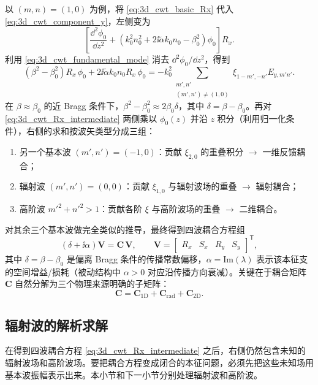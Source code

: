以 $(m,n)=(1,0)$ 为例，将 \cref{eq:3d_cwt_basic_Rx} 代入 \cref{eq:3d_cwt_component_y}，左侧变为
\[
\left[\frac{\dd^2\phi_0}{\dd z^2}+(k_0^2 n_0^2+2\ii\tilde\alpha k_0 n_0-\beta_0^2)\phi_0\right]R_x.
\]
利用 \cref{eq:3d_cwt_fundamental_mode} 消去 $\dd^2\phi_0/\dd z^2$，得到
\begin{equation}
(\beta^2-\beta_0^2)R_x\,\phi_0 + 2\ii\tilde\alpha k_0 n_0 R_x\,\phi_0
= -k_0^2\sum_{\substack{m',n'\\(m',n')\neq(1,0)}}\xi_{1-m',{-n'}}E_{y,m'n'}.
\label{eq:3d_cwt_Rx_intermediate}
\end{equation}
在 $\beta\approx\beta_0$ 的近 Bragg 条件下，$\beta^2-\beta_0^2\approx 2\beta_0\delta$，其中 $\delta=\beta-\beta_0$。再对 \cref{eq:3d_cwt_Rx_intermediate} 两侧乘以 $\phi_0(z)$ 并沿 $z$ 积分（利用归一化条件），右侧的求和按波矢类型分成三组：
\begin{enumerate}
  \item 另一个基本波 $(m',n')=(-1,0)$：贡献 $\xi_{2,0}$ 的重叠积分 $\to$ 一维反馈耦合；
  \item 辐射波 $(m',n')=(0,0)$：贡献 $\xi_{1,0}$ 与辐射波场的重叠 $\to$ 辐射耦合；
  \item 高阶波 $m'^2+n'^2>1$：贡献各阶 $\xi$ 与高阶波场的重叠 $\to$ 二维耦合。
\end{enumerate}
对其余三个基本波做完全类似的推导，最终得到四波耦合方程组
\begin{equation}
(\delta+\ii\alpha)\bm{V} = \bm{C}\,\bm{V},
\qquad
\bm{V} = \begin{bmatrix} R_x & S_x & R_y & S_y \end{bmatrix}^{\mathsf T},
\label{eq:3d_cwt_eigenvalue}
\end{equation}
其中 $\delta=\beta-\beta_0$ 是偏离 Bragg 条件的传播常数偏移，$\alpha=\mathrm{Im}(\lambda)$ 表示该本征支的空间增益/损耗（被动结构中 $\alpha>0$ 对应沿传播方向衰减）。关键在于耦合矩阵 $\bm{C}$ 自然分解为三个物理来源明确的子矩阵：
\begin{equation}
\bm{C} = \bm{C}_{\mathrm{1D}} + \bm{C}_{\mathrm{rad}} + \bm{C}_{\mathrm{2D}}.
\label{eq:3d_cwt_C_decomposition}
\end{equation}

\subsection{辐射波的解析求解}

在得到四波耦合方程 \cref{eq:3d_cwt_Rx_intermediate} 之后，右侧仍然包含未知的辐射波场和高阶波场。要把耦合方程变成闭合的本征问题，必须先把这些未知场用基本波振幅表示出来。本小节和下一小节分别处理辐射波和高阶波。

